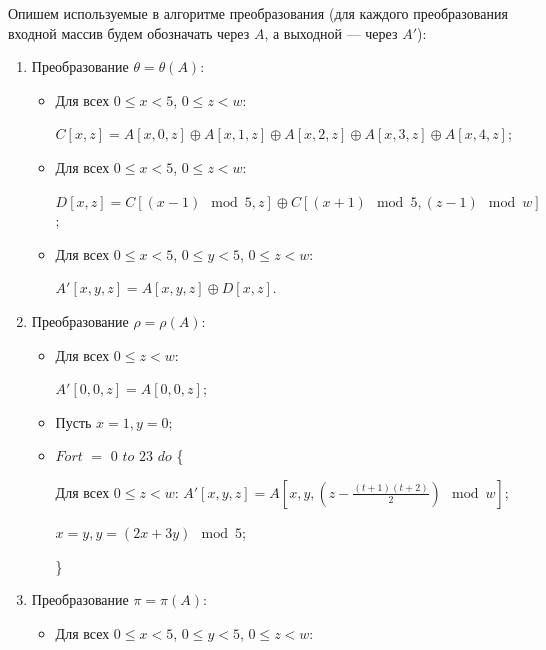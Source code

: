 \documentclass{./civarticle}
\begin{document}
Опишем используемые в алгоритме преобразования (для каждого преобразования входной массив будем обозначать через $A$, а выходной --- через $A'$):
\begin{enumerate}
    \item Преобразование $\theta = \theta(A)$:
    
    \begin{itemize}
        \item Для всех $0 \leq x < 5$, $0 \leq z < w$:
        
        $C[x, z] = A[x, 0, z] \oplus A[x, 1, z] \oplus A[x, 2, z] \oplus A[x, 3, z] \oplus A[x, 4, z]$;

        \item Для всех $0 \leq x < 5$, $0 \leq z < w$:
        
        $D[x, z] = C[(x-1) \mod 5, z] \oplus C[(x+1) \mod 5, (z-1) \mod w]$;

        \item Для всех $0 \leq x < 5$, $0 \leq y < 5$, $0 \leq z < w$:

        $A'[x, y, z] = A[x, y, z] \oplus D[x, z]$.
        
    \end{itemize}

    \item Преобразование $\rho = \rho(A)$:

    \begin{itemize}
        \item Для всех $0 \leq z < w$:

        $A'[0, 0, z] = A[0, 0, z]$;

        \item Пусть $x = 1, y = 0$;

        \item $For t$ $=$ $0$ $to$ $23$ $do$ \{
        
        \hspace{0.5cm} Для всех $0 \leq z < w$: 
        $A'[x, y, z] = A[x, y, (z-\frac{(t+1)(t+2)}{2}) \mod w]$;

        \hspace{0.5cm} $x = y, y = (2x + 3y) \mod 5$;

        \}
        
    \end{itemize}

    \item Преобразование $\pi = \pi(A)$:

    \begin{itemize}
        \item Для всех $0 \leq x < 5$, $0 \leq y < 5$, $0 \leq z < w$:


\end{itemize}
\end{enumerate}
\end{document}
